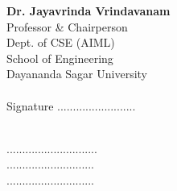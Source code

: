 \documentclass[ 12pt,a4paper,twocolumn,fleqn]{article}
\begin{document}
\hfill
\begin{minipage}[t]{0.34\textwidth}
\small
  \textbf{Dr. Jayavrinda Vrindavanam}\\
  Professor \& Chairperson\\
  Dept. of CSE (AIML)\\
  School of Engineering\\
  Dayananda Sagar University \\
  \\
  Signature .........................\\
\end{minipage}


\hfill
{} \\
\hfill{ .............................} \\
\hfill{ ............................} \\
\hfill{ ............................} \\

\newpage
  \pagestyle{fancy}
\thisfancypage{%
  \setlength{\fboxsep}{20pt}\doublebox}{}
  
\end{document}
